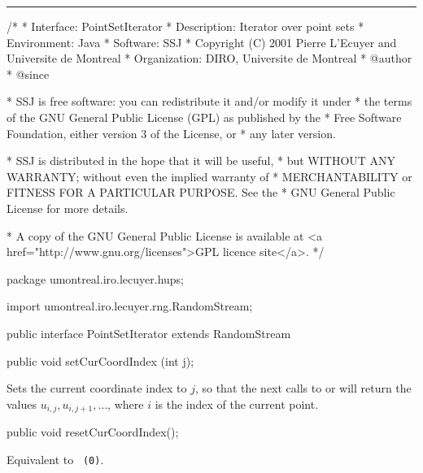 \bigskip\hrule\bigskip

\begin{code}
\begin{hide}
/*
 * Interface:    PointSetIterator
 * Description:  Iterator over point sets
 * Environment:  Java
 * Software:     SSJ 
 * Copyright (C) 2001  Pierre L'Ecuyer and Universite de Montreal
 * Organization: DIRO, Universite de Montreal
 * @author       
 * @since

 * SSJ is free software: you can redistribute it and/or modify it under
 * the terms of the GNU General Public License (GPL) as published by the
 * Free Software Foundation, either version 3 of the License, or
 * any later version.

 * SSJ is distributed in the hope that it will be useful,
 * but WITHOUT ANY WARRANTY; without even the implied warranty of
 * MERCHANTABILITY or FITNESS FOR A PARTICULAR PURPOSE.  See the
 * GNU General Public License for more details.

 * A copy of the GNU General Public License is available at
   <a href="http://www.gnu.org/licenses">GPL licence site</a>.
 */
\end{hide}
package umontreal.iro.lecuyer.hups;\begin{hide}

import umontreal.iro.lecuyer.rng.RandomStream;\end{hide}

public interface PointSetIterator extends RandomStream\begin{hide} {\end{hide}

   public void setCurCoordIndex (int j);
\end{code}
 \begin{tabb}
   Sets the current coordinate index to $j$, so that 
   the next calls to  or  
   will return the values $u_{i,j}, u_{i,j+1}, \dots$, where $i$ is the
   index of the current point.
 \end{tabb}
\begin{htmlonly}
\end{htmlonly}
\begin{code}

   public void resetCurCoordIndex();
\end{code}
 \begin{tabb}
  Equivalent to ~\texttt{(0)}.
 \end{tabb}
